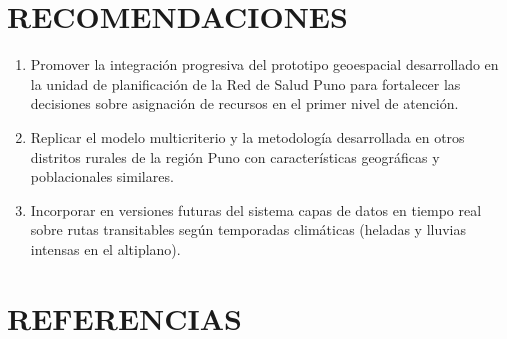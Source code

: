\documentclass[12pt,a4paper,oneside]{article}
\begin{document}
\newpage

\section{RECOMENDACIONES}

\begin{enumerate}
    \item Promover la integración progresiva del prototipo geoespacial desarrollado en la unidad de planificación de la Red de Salud Puno para fortalecer las decisiones sobre asignación de recursos en el primer nivel de atención.
    \item Replicar el modelo multicriterio y la metodología desarrollada en otros distritos rurales de la región Puno con características geográficas y poblacionales similares.
    \item Incorporar en versiones futuras del sistema capas de datos en tiempo real sobre rutas transitables según temporadas climáticas (heladas y lluvias intensas en el altiplano).
\end{enumerate}

\newpage

\section*{REFERENCIAS}
\end{document}
